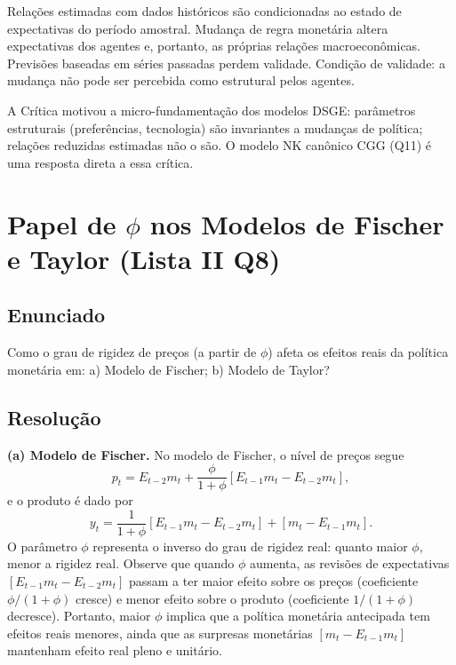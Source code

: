\documentclass[12pt, a4paper]{article}
\begin{document}
\begin{resultbox}[title={Crítica de Lucas (Lista II Q7)}]
Relações estimadas com dados históricos são condicionadas ao estado de expectativas do período amostral. Mudança de regra monetária altera expectativas dos agentes e, portanto, as próprias relações macroeconômicas. Previsões baseadas em séries passadas perdem validade. Condição de validade: a mudança não pode ser percebida como estrutural pelos agentes.
\end{resultbox}

\begin{provabox}[title={Implicação Metodológica da Crítica de Lucas (Q7)}]
A Crítica motivou a micro-fundamentação dos modelos DSGE: parâmetros estruturais (preferências, tecnologia) são invariantes a mudanças de política; relações reduzidas estimadas não o são. O modelo NK canônico CGG (Q11) é uma resposta direta a essa crítica.
\end{provabox}

\section{Papel de $\phi$ nos Modelos de Fischer e Taylor (Lista II Q8)}

\subsection*{Enunciado}
Como o grau de rigidez de preços (a partir de $\phi$) afeta os efeitos reais da política monetária em: a) Modelo de Fischer; b) Modelo de Taylor?

\subsection*{Resolução}

\textbf{(a) Modelo de Fischer.} No modelo de Fischer, o nível de preços segue
\[
p_t = E_{t-2}m_t + \frac{\phi}{1+\phi}\left[E_{t-1}m_t - E_{t-2}m_t\right],
\]
e o produto é dado por
\[
y_t = \frac{1}{1+\phi}\left[E_{t-1}m_t - E_{t-2}m_t\right] + \left[m_t - E_{t-1}m_t\right].
\]
O parâmetro $\phi$ representa o inverso do grau de rigidez real: quanto maior $\phi$, menor a rigidez real. Observe que quando $\phi$ aumenta, as revisões de expectativas $[E_{t-1}m_t - E_{t-2}m_t]$ passam a ter maior efeito sobre os preços (coeficiente $\phi/(1+\phi)$ cresce) e menor efeito sobre o produto (coeficiente $1/(1+\phi)$ decresce). Portanto, maior $\phi$ implica que a política monetária antecipada tem efeitos reais menores, ainda que as surpresas monetárias $[m_t - E_{t-1}m_t]$ mantenham efeito real pleno e unitário.
\end{document}
